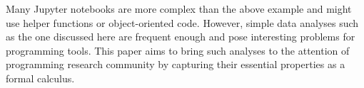 \documentclass[english,submission]{programming}
\theoremstyle{plain}
\theoremstyle{definition}
\begin{document}
\noindent
Many Jupyter notebooks are more complex than the above example and might use helper
functions or object-oriented code. However, simple data analyses such as the one discussed
here are frequent enough and pose interesting problems for programming tools.
This paper aims to bring such analyses to the attention of programming research community
by capturing their essential properties as a formal calculus.


\begin{figure}
  \vspace{-1.5em}
  \centering

\end{figure}
\end{document}
